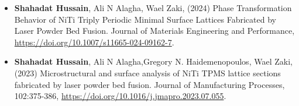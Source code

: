 

\begin{cvparagraph}

\begin{itemize}

    \item \textcolor{russell}{\textbf{Shahadat Hussain}, Ali N Alagha, Wael Zaki, (2024) Phase Transformation Behavior of NiTi Triply Periodic Minimal Surface Lattices Fabricated by Laser Powder Bed Fusion. Journal of Materials Engineering and Performance,} \url{https://doi.org/10.1007/s11665-024-09162-7}.

    \item \textcolor{russell}{\textbf{Shahadat Hussain}, Ali N Alagha,Gregory N. Haidemenopoulos, Wael Zaki, (2023) Microstructural and surface analysis of NiTi TPMS lattice sections fabricated by laser powder bed fusion. Journal of Manufacturing Processes, 102:375-386,} \url{https://doi.org/10.1016/j.jmapro.2023.07.055}.
    
    
    

    

\end{itemize}
\end{cvparagraph}
